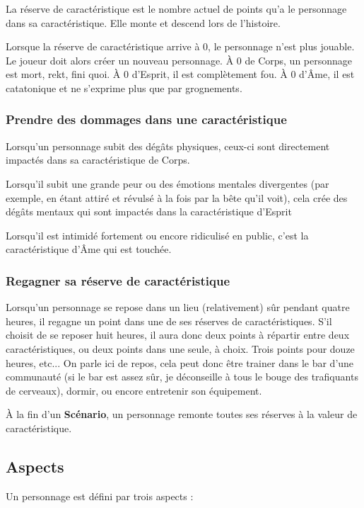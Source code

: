 \documentclass[twoside,12pt,english]{book}
\begin{document}
La réserve de caractéristique est le nombre actuel de points qu'a le personnage dans sa caractéristique. Elle monte et descend lors de l'histoire.

Lorsque la réserve de caractéristique arrive à 0, le personnage n'est plus jouable. Le joueur doit alors créer un nouveau personnage. À 0 de Corps, un personnage est mort, rekt, fini quoi. À 0 d'Esprit, il est complètement fou. À 0 d'Âme, il est catatonique et ne s'exprime plus que par grognements.

\subsubsection*{Prendre des dommages dans une caractéristique}

Lorsqu'un personnage subit des dégâts physiques, ceux-ci sont directement impactés dans sa caractéristique de Corps.

Lorsqu'il subit une grande peur ou des émotions mentales divergentes (par exemple, en étant attiré et révulsé à la fois par la bête qu'il voit), cela crée des dégâts mentaux qui sont impactés dans la caractéristique d'Esprit

Lorsqu'il est intimidé fortement ou encore ridiculisé en public, c'est la caractéristique d'Âme qui est touchée.

\subsubsection*{Regagner sa réserve de caractéristique}

Lorsqu'un personnage se repose dans un lieu (relativement) sûr pendant quatre heures, il regagne un point dans une de ses réserves de caractéristiques. S'il choisit de se reposer huit heures, il aura donc deux points à répartir entre deux caractéristiques, ou deux points dans une seule, à choix. Trois points pour douze heures, etc... On parle ici de repos, cela peut donc être trainer dans le bar d'une communauté (si le bar est assez sûr, je déconseille à tous le bouge des trafiquants de cerveaux), dormir, ou encore entretenir son équipement.

À la fin d'un \textbf{Scénario}, un personnage remonte toutes ses réserves à la valeur de caractéristique.

\subsection{Aspects}

Un personnage est défini par trois aspects :
\end{document}
